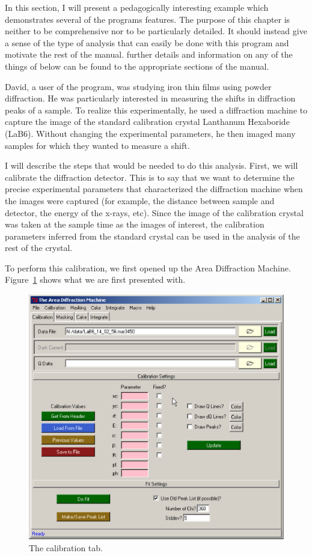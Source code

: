 In this section, I will present a pedagogically interesting 
example which demonstrates several of the programs features. 
The purpose of this chapter is neither to be comprehensive
nor to be particularly detailed. It should instead give a 
sense of the type of analysis that can easily be done with 
this program and motivate the rest of the manual. 
further details and information on any of 
the things of below can be found to the appropriate sections 
of the manual.

David, a user of the program, was studying iron thin films 
using powder diffraction. He was particularly interested in 
measuring the shifts in diffraction peaks of a sample. To 
realize this experimentally, he used a diffraction machine 
to capture the image of the standard calibration crystal 
Lanthanum Hexaboride (LaB6). Without changing the experimental 
parameters, he then imaged many samples for which they wanted 
to measure a shift.

I will describe the steps that would be needed to do this
analysis. First, we will calibrate the diffraction detector.
This is to say that we want to determine the precise 
experimental parameters that characterized the diffraction
machine when the images were captured (for example, the distance
between sample and detector, the energy of the x-rays, etc). Since 
the image of the calibration crystal was taken at the sample
time as the images of interest, the calibration parameters inferred
from the standard crystal can be used in the analysis of the
rest of the crystal.

To perform this calibration, we first opened up the Area 
Diffraction Machine. Figure~\ref{calibration_page_example} shows what we
are first presented with.

\begin{figure}
    \centering
    \includegraphics[scale=.75]{figures/calibration_page.eps}
    \caption{The calibration tab.}
    \label{calibration_page_example}
\end{figure}

